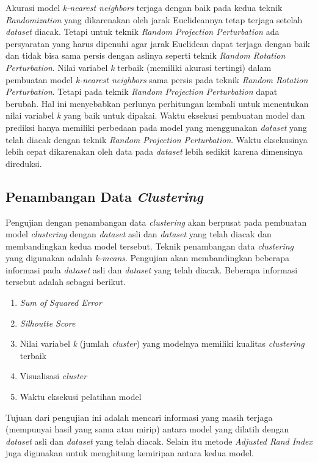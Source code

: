 Akurasi model \textit{k-nearest neighbors} terjaga dengan baik pada kedua teknik \textit{Randomization} yang dikarenakan oleh jarak Euclideannya tetap terjaga setelah \textit{dataset} diacak. Tetapi untuk teknik \textit{Random Projection Perturbation} ada persyaratan yang harus dipenuhi agar jarak Euclidean dapat terjaga dengan baik dan tidak bisa sama persis dengan aslinya seperti teknik \textit{Random Rotation Perturbation}. Nilai variabel \textit{k} terbaik (memiliki akurasi tertingi) dalam pembuatan model \textit{k-nearest neighbors} sama persis pada teknik \textit{Random Rotation Perturbation}. Tetapi pada teknik \textit{Random Projection Perturbation} dapat berubah. Hal ini menyebabkan perlunya perhitungan kembali untuk menentukan nilai variabel \textit{k} yang baik untuk dipakai. Waktu eksekusi pembuatan model dan prediksi hanya memiliki perbedaan pada model yang menggunakan \textit{dataset} yang telah diacak dengan teknik \textit{Random Projection Perturbation}. Waktu eksekusinya lebih cepat dikarenakan oleh data pada \textit{dataset} lebih sedikit karena dimensinya direduksi.

\subsection{Penambangan Data \textit{Clustering}}
\label{subsec:pengujian-clustering}

Pengujian dengan penambangan data \textit{clustering} akan berpusat pada pembuatan model \textit{clustering} dengan \textit{dataset} asli dan \textit{dataset} yang telah diacak dan membandingkan kedua model tersebut. Teknik penambangan data \textit{clustering} yang digunakan adalah \textit{k-means}. Pengujian akan membandingkan beberapa informasi pada \textit{dataset} asli dan \textit{dataset} yang telah diacak. Beberapa informasi tersebut adalah sebagai berikut.
\begin{enumerate}
	\item \textit{Sum of Squared Error}
	\item \textit{Silhoutte Score}
	\item Nilai variabel \textit{k} (jumlah \textit{cluster}) yang modelnya memiliki kualitas \textit{clustering} terbaik
	\item Visualisasi \textit{cluster}
	\item Waktu eksekusi pelatihan model
\end{enumerate}
Tujuan dari pengujian ini adalah mencari informasi yang masih terjaga (mempunyai hasil yang sama atau mirip) antara model yang dilatih dengan \textit{dataset} asli dan \textit{dataset} yang telah diacak. Selain itu metode \textit{Adjusted Rand Index} juga digunakan untuk menghitung kemiripan antara kedua model.

